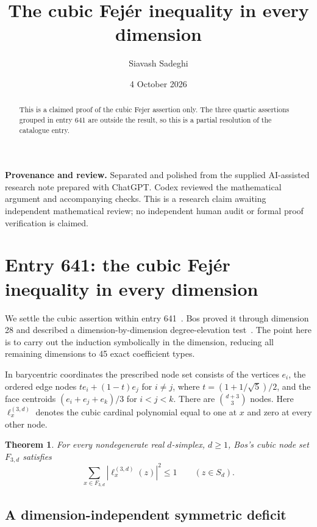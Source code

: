 \documentclass[11pt,a4paper]{article}
\newtheorem{theorem}{Theorem}[section]
\theoremstyle{remark}
\begin{document}
\title{The cubic Fej\'er inequality in every dimension}
\author{Siavash Sadeghi}
\date{4 October 2026}
\maketitle
\begin{abstract}
This is a claimed proof of the cubic Fejer assertion only. The three quartic assertions grouped in entry 641 are outside the result, so this is a partial resolution of the catalogue entry.
\end{abstract}
\textbf{Provenance and review.} Separated and polished from the supplied AI-assisted research note prepared with ChatGPT. Codex reviewed the mathematical argument and accompanying checks. This is a research claim awaiting independent mathematical review; no independent human audit or formal proof verification is claimed.
\medskip
\section{Entry 641: the cubic Fej\'er inequality in every dimension}\label{sec:cubic}

We settle the cubic assertion within entry 641~\cite{repo641}. Bos proved it through dimension 28 and described a dimension-by-dimension degree-elevation test~\cite{bos}. The point here is to carry out the induction symbolically in the dimension, reducing all remaining dimensions to 45 exact coefficient types.

In barycentric coordinates the prescribed node set consists of the vertices
$e_i$, the ordered edge nodes $t e_i+(1-t)e_j$ for $i\ne j$, where
$t=(1+1/\sqrt5)/2$, and the face centroids $(e_i+e_j+e_k)/3$ for $i<j<k$.
There are $\binom{d+3}{3}$ nodes. Here $\ell_x^{(3,d)}$ denotes the cubic
cardinal polynomial equal to one at $x$ and zero at every other node.

\begin{theorem}\label{thm:cubic}
For every nondegenerate real $d$-simplex, $d\ge1$, Bos's cubic node set $F_{3,d}$ satisfies
\[
 \sum_{x\in F_{3,d}}|\ell_x^{(3,d)}(z)|^2\le1
 \qquad(z\in S_d).
\]
\end{theorem}

\subsection{A dimension-independent symmetric deficit}
\end{document}
